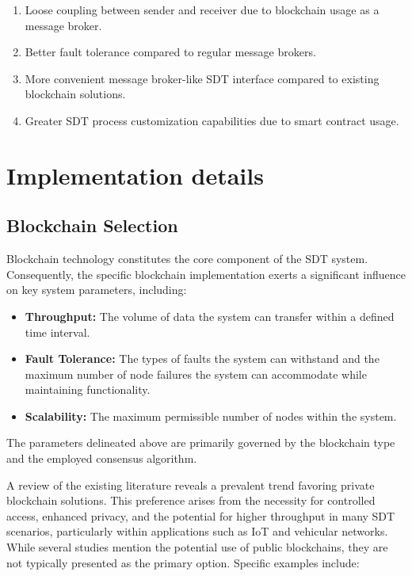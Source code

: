 \documentclass[10pt]{llncs}
\begin{document}
\begin{enumerate}
    \item Loose coupling between sender and receiver due to blockchain usage as a message broker.
    \item Better fault tolerance compared to regular message brokers.
    \item More convenient message broker-like SDT interface compared to existing blockchain solutions.
    \item Greater SDT process customization capabilities due to smart contract usage.
\end{enumerate}

\section{Implementation details} \label{implementation_details}

\subsection{Blockchain Selection}

Blockchain technology constitutes the core component of the SDT system. 
Consequently, the specific blockchain implementation exerts a significant influence on key system parameters, including:

\begin{itemize}
    \item \textbf{Throughput:} The volume of data the system can transfer within a defined time interval.
    \item \textbf{Fault Tolerance:} The types of faults the system can withstand and the maximum number of node failures the system can accommodate while maintaining functionality.
    \item \textbf{Scalability:} The maximum permissible number of nodes within the system.
\end{itemize}

The parameters delineated above are primarily governed by the blockchain type and the employed consensus algorithm.

A review of the existing literature reveals a prevalent trend favoring private blockchain solutions. 
This preference arises from the necessity for controlled access, enhanced privacy, and the potential for higher throughput in many SDT scenarios, particularly within applications such as IoT and vehicular networks. 
While several studies mention the potential use of public blockchains, they are not typically presented as the primary option.  
Specific examples include:
\end{document}
